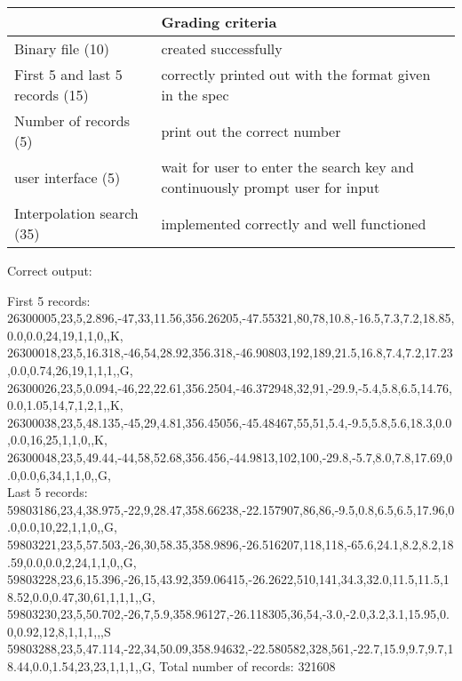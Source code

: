 \documentclass[10pt]{article}
\begin{document}
\begin{tabular}{ | l | l | l | }
  \hline
  & Grading criteria \\ \hline
  Binary file (10) & created successfully \\ \hline
  First 5 and last 5 records (15) & correctly printed out with the
  format given in the spec \\ \hline
  Number of records (5) & print out the correct number \\ \hline
  user interface (5) & wait for user to enter the search key and
  continuously prompt user for input \\ \hline
  Interpolation search (35) & implemented correctly and well functioned \\ \hline
\end{tabular}

\vspace{3em}
Correct output:\\

\begin{framed}
  \noindent
  First 5 records:\\
  26300005,23,5,2.896,-47,33,11.56,356.26205,-47.55321,80,78,10.8,-16.5,7.3,7.2,18.85,0.0,0.0,24,19,1,1,0,,K,
  26300018,23,5,16.318,-46,54,28.92,356.318,-46.90803,192,189,21.5,16.8,7.4,7.2,17.23,0.0,0.74,26,19,1,1,1,,G,
  26300026,23,5,0.094,-46,22,22.61,356.2504,-46.372948,32,91,-29.9,-5.4,5.8,6.5,14.76,0.0,1.05,14,7,1,2,1,,K,
  26300038,23,5,48.135,-45,29,4.81,356.45056,-45.48467,55,51,5.4,-9.5,5.8,5.6,18.3,0.0,0.0,16,25,1,1,0,,K,
  26300048,23,5,49.44,-44,58,52.68,356.456,-44.9813,102,100,-29.8,-5.7,8.0,7.8,17.69,0.0,0.0,6,34,1,1,0,,G,\\
  Last 5 records:\\
  59803186,23,4,38.975,-22,9,28.47,358.66238,-22.157907,86,86,-9.5,0.8,6.5,6.5,17.96,0.0,0.0,10,22,1,1,0,,G,
  59803221,23,5,57.503,-26,30,58.35,358.9896,-26.516207,118,118,-65.6,24.1,8.2,8.2,18.59,0.0,0.0,2,24,1,1,0,,G,
  59803228,23,6,15.396,-26,15,43.92,359.06415,-26.2622,510,141,34.3,32.0,11.5,11.5,18.52,0.0,0.47,30,61,1,1,1,,G,
  59803230,23,5,50.702,-26,7,5.9,358.96127,-26.118305,36,54,-3.0,-2.0,3.2,3.1,15.95,0.0,0.92,12,8,1,1,1,,,S
  59803288,23,5,47.114,-22,34,50.09,358.94632,-22.580582,328,561,-22.7,15.9,9.7,9.7,18.44,0.0,1.54,23,23,1,1,1,,G, 
  \noindent
  Total number of records: 321608
\end{framed}
\end{document}
